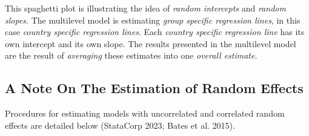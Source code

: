 \documentclass[
  letterpaper,
  DIV=11,
  numbers=noendperiod]{scrreprt}
\begin{document}
\begin{tcolorbox}[enhanced jigsaw, arc=.35mm, bottomrule=.15mm, bottomtitle=1mm, breakable, colback=white, colbacktitle=quarto-callout-tip-color!10!white, colframe=quarto-callout-tip-color-frame, coltitle=black, left=2mm, leftrule=.75mm, opacityback=0, opacitybacktitle=0.6, rightrule=.15mm, title=\textcolor{quarto-callout-tip-color}{\faLightbulb}\hspace{0.5em}{Random Slopes and Random Intercepts}, titlerule=0mm, toprule=.15mm, toptitle=1mm]

This spaghetti plot is illustrating the idea of \emph{random intercepts}
and \emph{random slopes}. The multilevel model is estimating \emph{group
specific regression lines}, in this case \emph{country specific
regression lines}. Each \emph{country specific regression line} has its
own intercept and its own slope. The results presented in the multilevel
model are the result of \emph{averaging} these estimates into one
\emph{overall estimate}.

\end{tcolorbox}

\subsection{A Note On The Estimation of Random
Effects}\label{a-note-on-the-estimation-of-random-effects}

Procedures for estimating models with uncorrelated and correlated random
effects are detailed below (StataCorp 2023; Bates et al. 2015).
\end{document}
